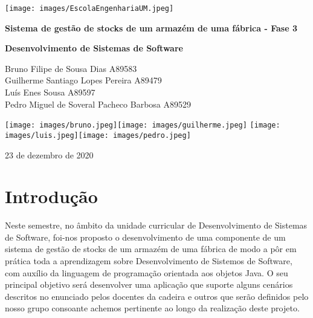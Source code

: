 \documentclass[11pt]{article}
\begin{document}
\begin{titlepage}
   \begin{center}
       
       \texttt{[image: images/EscolaEngenhariaUM.jpeg]}
       
       \vspace*{0.5cm}
       
       \textbf{\Large Sistema de gestão de stocks de um	armazém de uma fábrica - Fase 3}

       \vspace{1.3cm}
       \textbf{\large Desenvolvimento de Sistemas de Software}
            
       \vspace{1.3cm}

       Bruno Filipe de Sousa Dias A89583\\ Guilherme Santiago Lopes Pereira A89479 \\ Luís Enes Sousa A89597\\ Pedro Miguel de Soveral Pacheco Barbosa A89529

       \vspace{1.5cm}
       
       \texttt{[image: images/bruno.jpeg]}\hspace{0.2cm}\texttt{[image: images/guilherme.jpeg]}
       \vspace{0.15cm}
       \hspace{0.1cm}\texttt{[image: images/luis.jpeg]}\hspace{0.1cm}\texttt{[image: images/pedro.jpeg]}
       
        
        23 de dezembro de 2020
            
   \end{center}
\end{titlepage}

\tableofcontents
\thispagestyle{empty}
\cleardoublepage

\setcounter{page}{1}

\section{Introdução}

Neste semestre, no âmbito da unidade curricular de Desenvolvimento de Sistemas de Software, foi-nos proposto o desenvolvimento de uma componente de um sistema de gestão de stocks de um armazém de uma fábrica de modo a pôr em prática toda a aprendizagem sobre Desenvolvimento de Sistemos de Software, com auxílio da linguagem de programação orientada aos objetos Java. O seu principal objetivo será desenvolver uma aplicação que suporte alguns cenários descritos no enunciado pelos docentes da cadeira e outros que serão definidos pelo nosso grupo consoante achemos pertinente ao longo da realização deste projeto.
\end{document}
